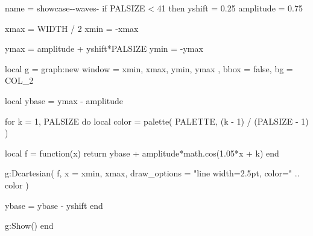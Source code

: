 
\bigskip\bigskip


\begin{luadraw}{name = showcase-\STYLE-waves-\PALETTE}
if PALSIZE < 41 then
  yshift    = 0.25
  amplitude = 0.75

  xmax = WIDTH / 2
  xmin = -xmax

  ymax = amplitude + yshift*PALSIZE
  ymin = -ymax

  local g = graph:new{
    window = {
      xmin, xmax,
      ymin, ymax
    },
    bbox = false,
    bg   = COL_2
  }

  local ybase = ymax - amplitude

  for k = 1, PALSIZE do
    local color = palette(
      PALETTE,
      (k - 1) / (PALSIZE - 1)
    )

    local f = function(x)
      return ybase + amplitude*math.cos(1.05*x + k)
    end

    g:Dcartesian(
      f,
      {
        x            = {xmin, xmax},
        draw_options = "line width=2.5pt, color=" .. color
      }
    )

    ybase = ybase - yshift
  end

  g:Show()
end
\end{luadraw}


